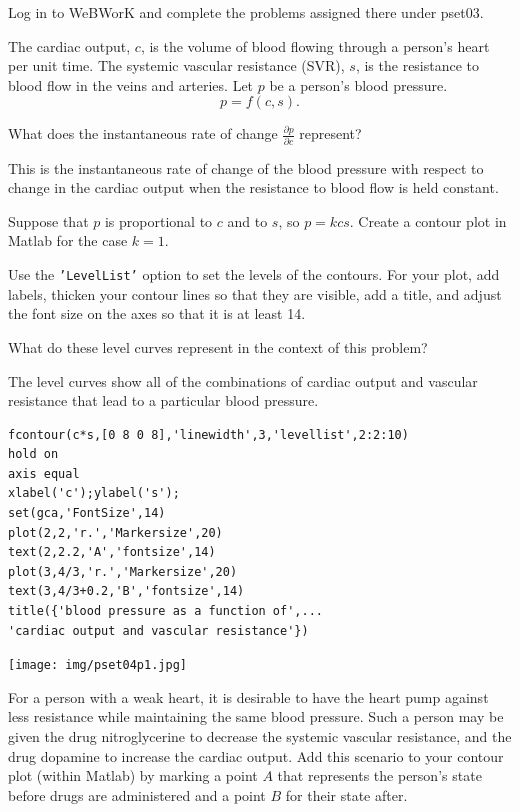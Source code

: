 \documentclass[12pt,letterpaper,noanswers]{exam}
\begin{document}
\begin{questions}
\question Log in to WeBWorK and complete the problems assigned there under pset03.


\question The cardiac output, $c$, is the volume of blood flowing through a person's heart per unit time.  The systemic vascular resistance (SVR), $s$, is the resistance to blood flow in the veins and arteries.  Let $p$ be a person's blood pressure.  \[p=f(c,s).\]
\begin{parts}
\item What does the instantaneous rate of change $\displaystyle\frac{\partial p}{\partial c}$ represent?
\begin{solution}
This is the instantaneous rate of change of the blood pressure with respect to change in the cardiac output when the resistance to blood flow is held constant.
\end{solution}
\item Suppose that $p$ is proportional to $c$ and to $s$, so $\displaystyle p = k c s$.  Create a contour plot in Matlab for the case $k = 1.$


Use the \texttt{'LevelList'} option to set the levels of the contours.
For your plot, add labels, thicken your contour lines so that they are visible, add a title, and adjust the font size on the axes so that it is at least 14.

What do these level curves represent in the context of this problem?
\begin{solution}
The level curves show all of the combinations of cardiac output and vascular resistance that lead to a particular blood pressure.

\begin{verbatim}
fcontour(c*s,[0 8 0 8],'linewidth',3,'levellist',2:2:10)
hold on
axis equal
xlabel('c');ylabel('s');
set(gca,'FontSize',14)
plot(2,2,'r.','Markersize',20)
text(2,2.2,'A','fontsize',14)
plot(3,4/3,'r.','Markersize',20)
text(3,4/3+0.2,'B','fontsize',14)
title({'blood pressure as a function of',...
'cardiac output and vascular resistance'})
\end{verbatim}

\texttt{[image: img/pset04p1.jpg]}

\end{solution}

\item For a person with a weak heart, it is desirable to have the heart pump against less resistance while maintaining the same blood pressure.  Such a person may be given the drug nitroglycerine to decrease the systemic vascular resistance, and the drug dopamine to increase the cardiac output.  Add this scenario to your contour plot (within Matlab) by marking a point $A$ that represents the person's state before drugs are administered and a point $B$ for their state after.


\end{parts}
\end{questions}
\end{document}
